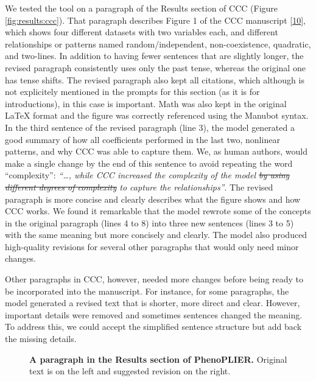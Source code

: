 \documentclass[
]{article}
\begin{document}
We tested the tool on a paragraph of the Results section of CCC (Figure \ref{fig:results:ccc}).
That paragraph describes Figure 1 of the CCC manuscript {[}\protect\hyperlink{ref-eirYTTyk}{10}{]}, which shows four different datasets with two variables each, and different relationships or patterns named random/independent, non-coexistence, quadratic, and two-lines.
In addition to having fewer sentences that are slightly longer, the revised paragraph consistently uses only the past tense, whereas the original one has tense shifts.
The revised paragraph also kept all citations, which although is not explicitely mentioned in the prompts for this section (as it is for introductions), in this case is important.
Math was also kept in the original LaTeX format and the figure was correctly referenced using the Manubot syntax.
In the third sentence of the revised paragraph (line 3), the model generated a good summary of how all coefficients performed in the last two, nonlinear patterns, and why CCC was able to capture them.
We, as human authors, would make a single change by the end of this sentence to avoid repeating the word ``complexity'': \emph{``\ldots, while CCC increased the complexity of the model \sout{by using different degrees of complexity} to capture the relationships''}.
The revised paragraph is more concise and clearly describes what the figure shows and how CCC works.
We found it remarkable that the model rewrote some of the concepts in the original paragraph (lines 4 to 8) into three new sentences (lines 3 to 5) with the same meaning but more concisely and clearly.
The model also produced high-quality revisions for several other paragraphs that would only need minor changes.

Other paragraphs in CCC, however, needed more changes before being ready to be incorporated into the manuscript.
For instance, for some paragraphs, the model generated a revised text that is shorter, more direct and clear.
However, important details were removed and sometimes sentences changed the meaning.
To address this, we could accept the simplified sentence structure but add back the missing details.

\begin{figure}
\hypertarget{fig:results:phenoplier}{%
\centering

\caption{\textbf{A paragraph in the Results section of PhenoPLIER.}
Original text is on the left and suggested revision on the right.}\label{fig:results:phenoplier}
}
\end{figure}
\end{document}
